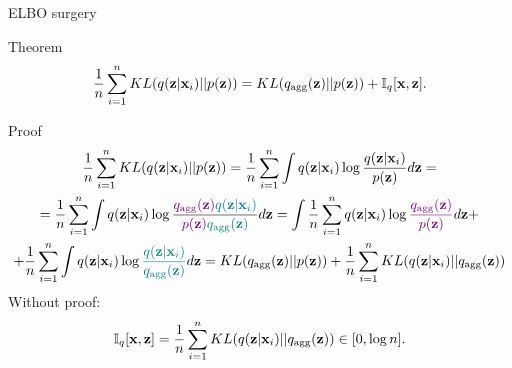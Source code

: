 \begin{frame}{ELBO surgery}
	\begin{block}{Theorem}
		\vspace{-0.3cm}
		\[
		    \frac{1}{n} \sum_{i=1}^n KL(q(\mathbf{z} | \mathbf{x}_i) || p(\mathbf{z})) = KL(q_{\text{agg}}(\mathbf{z}) || p(\mathbf{z})) + \mathbb{I}_q [\mathbf{x}, \mathbf{z}].
		\]
		\vspace{-0.4cm}
	\end{block}
	\begin{block}{Proof}
		\vspace{-0.5cm}
		{\footnotesize
		\begin{multline*}
		    \frac{1}{n} \sum_{i=1}^n KL(q(\mathbf{z} | \mathbf{x}_i) || p(\mathbf{z})) = \frac{1}{n} \sum_{i=1}^n \int q(\mathbf{z} | \mathbf{x}_i) \log \frac{q(\mathbf{z} | \mathbf{x}_i)}{p(\mathbf{z})} d \mathbf{z} = \\
		    = \frac{1}{n} \sum_{i=1}^n \int q(\mathbf{z} | \mathbf{x}_i) \log \frac{{\color{violet}q_{\text{agg}}(\mathbf{z})} {\color{teal}q(\mathbf{z} | \mathbf{x}_i)}}{{\color{violet}p(\mathbf{z})} {\color{teal}q_{\text{agg}}(\mathbf{z})}} d \mathbf{z} 
		    = \int \frac{1}{n} \sum_{i=1}^n  q(\mathbf{z} | \mathbf{x}_i) \log {\color{violet}\frac{q_{\text{agg}}(\mathbf{z})}{p(\mathbf{z})}} d \mathbf{z} + \\ 
		    + \frac{1}{n}\sum_{i=1}^n \int q(\mathbf{z} | \mathbf{x}_i) \log {\color{teal}\frac{q(\mathbf{z}| \mathbf{x}_i)}{q_{\text{agg}}(\mathbf{z})}} d \mathbf{z} = 
		     KL (q_{\text{agg}}(\mathbf{z}) || p(\mathbf{z})) + \frac{1}{n}\sum_{i=1}^n KL(q(\mathbf{z} | \mathbf{x}_i) || q_{\text{agg}}(\mathbf{z}))
		\end{multline*}
		}
		Without proof:
		\vspace{-0.4cm}
		\[
			\mathbb{I}_{q} [\mathbf{x}, \mathbf{z}] = \frac{1}{n}\sum_{i=1}^n KL(q(\mathbf{z} | \mathbf{x}_i) || q_{\text{agg}}(\mathbf{z})) \in [0, \log n].
		\]
	\end{block}

\end{frame}
